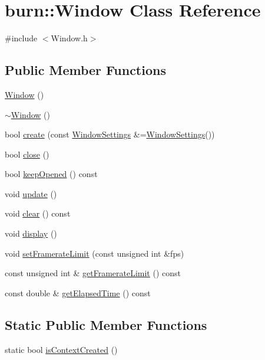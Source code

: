 \hypertarget{classburn_1_1_window}{\section{burn\-:\-:Window Class Reference}
\label{classburn_1_1_window}
}


{\ttfamily \#include $<$Window.\-h$>$}

\subsection*{Public Member Functions}
\begin{DoxyCompactItemize}
\item 
\hyperlink{classburn_1_1_window_acc7f6464e1ed22854f41342becb51e62}{Window} ()
\item 
\hyperlink{classburn_1_1_window_a47bd487f48808cab78faa5713e15f0c3}{$\sim$\-Window} ()
\item 
bool \hyperlink{classburn_1_1_window_a80b727274500cf2f093c2bd2fffa4b75}{create} (const \hyperlink{classburn_1_1_window_settings}{Window\-Settings} \&=\hyperlink{classburn_1_1_window_settings}{Window\-Settings}())
\item 
bool \hyperlink{classburn_1_1_window_a1bed3eba8c1da3f0a58a3ed5de2c1071}{close} ()
\item 
bool \hyperlink{classburn_1_1_window_aefd7af7009fee4982b04ac946540f7ee}{keep\-Opened} () const 
\item 
void \hyperlink{classburn_1_1_window_a81e1da9f111938b38bc4c2c06dac9cfd}{update} ()
\item 
void \hyperlink{classburn_1_1_window_a2e6c75cedaeb5571aaac2921bf8bcb6e}{clear} () const 
\item 
void \hyperlink{classburn_1_1_window_a017ddbce346ebe3e11e2abc6ce0948e0}{display} ()
\item 
void \hyperlink{classburn_1_1_window_a840d45e13910496fe9edd45d844e46a1}{set\-Framerate\-Limit} (const unsigned int \&fps)
\item 
const unsigned int \& \hyperlink{classburn_1_1_window_aa694b6ed57c02e625fff074f31a107c9}{get\-Framerate\-Limit} () const 
\item 
const double \& \hyperlink{classburn_1_1_window_ae5af78665f468bd19ebb38a8ac13b701}{get\-Elapsed\-Time} () const 
\end{DoxyCompactItemize}
\subsection*{Static Public Member Functions}
\begin{DoxyCompactItemize}
\item 
static bool \hyperlink{classburn_1_1_window_ab5f58992b7d89ca04c57516bd128780c}{is\-Context\-Created} ()
\end{DoxyCompactItemize}


